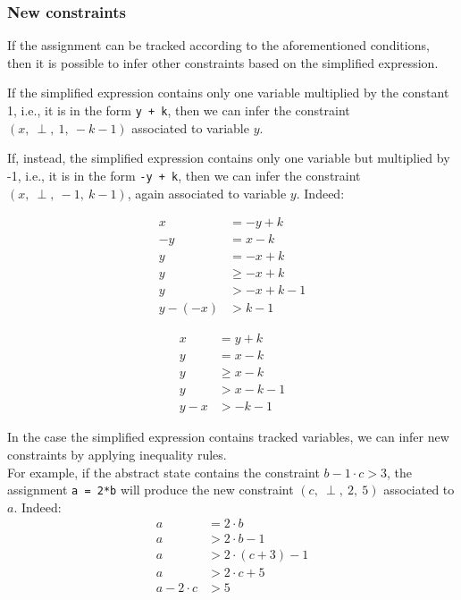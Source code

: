 \documentclass{article}
\newcounter{subsubsubsection}[subsubsection]
\newcommand{\spc}{\:}
\newcommand{\constraint}[4]{(#1,\spc #2,\spc #3,\spc #4)}
\begin{document}
\subsubsection{New constraints}
\label{new_constraints}
If the assignment can be tracked according to the aforementioned conditions, then it is possible to infer other constraints based on the simplified expression.

\label{reverse_assignement}
If the simplified expression contains only one variable multiplied by the constant 1, i.e., it is in the form \texttt{y + k},
then we can infer the constraint $\constraint{x}{\perp}{1}{-k-1}$ associated to variable $y$.

If, instead, the simplified expression contains only one variable but multiplied by -1, i.e., it is in the form \texttt{-y + k}, then we can infer the constraint $\constraint{x}{\perp}{-1}{k-1}$, again associated to variable $y$. Indeed:


\noindent\begin{minipage}{.5\linewidth}
\begin{align*}
    x &= -y + k\\
    -y &= x - k\\
    y &= -x + k\\
    y &\geq -x + k\\
    y &> -x + k - 1\\
    y - (-x) &> k - 1
\end{align*}
\end{minipage}%
\begin{minipage}{.5\linewidth}
\begin{align*}
    x &= y + k\\
    y &= x - k\\
    y &\geq x - k\\
    y &> x - k - 1\\
    y - x &> - k - 1
\end{align*}
\end{minipage}


\label{ineq_chain}
In the case the simplified expression contains tracked variables, we can infer new constraints by applying inequality rules.
\\
For example, if the abstract state contains the constraint $b - 1\cdot c > 3$, the assignment \texttt{a = 2*b} will produce the new constraint $(c,\spc \perp,\spc 2, \spc 5)$ associated to $a$. Indeed:
\begin{align*}
    a &= 2\cdot b\\
    a &> 2\cdot b - 1\\
    a &> 2\cdot (c+3) - 1\\
    a &> 2\cdot c + 5\\
    a - 2\cdot c &> 5
\end{align*}
    
\end{document}
